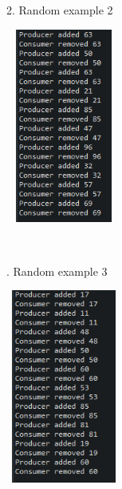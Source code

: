 \documentclass[14pt]{article}
\begin{document}
\begin{center}
2. Random example 2\\
\vspace{5mm}

\includegraphics[height=2.5in, width = 1.5in]{pcsem2.png}\\
\end{center}\\

\begin{center}
. Random example 3\\
\vspace{10mm}

\includegraphics[height=2.5in, width = 1.5in]{pcsem3.png}\\
\end{center}\\
\end{document}
